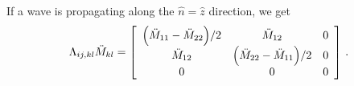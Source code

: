 \documentclass[main.tex]{subfiles}
\begin{document}
If a wave is propagating along the \(\hat{n} = \hat{z}\) direction, we get 
%
\begin{align}
\Lambda_{ij, kl} \ddot{M}_{kl} = \left[\begin{array}{ccc}
\qty(\ddot{M}_{11} - \ddot{M}_{22}) / 2 &  \ddot{M}_{12} & 0 \\ 
\ddot{M}_{12} & \qty(\ddot{M}_{22} - \ddot{M}_{11}) / 2 & 0 \\ 
0 & 0 & 0
\end{array}\right]
\,.
\end{align}
\end{document}
